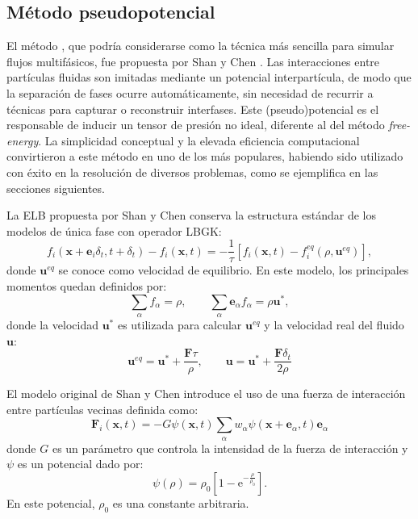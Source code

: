 \subsection*{M\'etodo pseudopotencial}
El m\'etodo \pp{}, que podr\'ia considerarse como la t\'ecnica m\'as sencilla para simular flujos multif\'asicos, fue propuesta por Shan y Chen \cite{shan_lattice_1993,shan_simulation_1994}. Las interacciones entre part\'iculas fluidas son imitadas mediante un potencial interpart\'icula, de modo que la separaci\'on de fases ocurre autom\'aticamente, sin necesidad de recurrir a t\'ecnicas para capturar o reconstruir interfases. Este (pseudo)potencial es el responsable de inducir un tensor de presi\'on no ideal, diferente al del m\'etodo \emph{free-energy}. La simplicidad conceptual y la elevada eficiencia computacional convirtieron a este m\'etodo en uno de los m\'as populares, habiendo sido utilizado con \'exito en la resoluci\'on de diversos problemas, como se ejemplifica en las secciones siguientes.
\par 
La ELB propuesta por Shan y Chen conserva la estructura est\'andar de los modelos de \'unica fase con operador LBGK:
\begin{equation}
	f_i(\bm{x}+\bm{e}_i\delta_t,t+\delta_t) - f_i(\bm{x},t)= -\dfrac{1}{\tau}\left[ f_i(\bm{x},t) - f_i^{eq}(\rho,\bm{u}^{eq}) \right],
\end{equation}
donde $\bm{u}^{eq}$ se conoce como velocidad de equilibrio. En este modelo, los principales momentos quedan definidos por:
\begin{equation}
	\sum_{\alpha} f_{\alpha} = \rho, \qquad	\sum_{\alpha} \bm{e}_{\alpha} f_{\alpha} = \rho \bm{u}^*,
\end{equation}
donde la velocidad $\bm{u}^*$ es utilizada para calcular $\bm{u}^{eq}$ y la velocidad real del fluido $\bm{u}$:
\begin{equation}
	\bm{u}^{eq} = \bm{u}^* + \dfrac{\bm{F}\tau}{\rho}, \qquad \bm{u} = \bm{u}^* + \dfrac{\bm{F}\delta_t}{2\rho}
\end{equation}

El modelo original de Shan y Chen introduce el uso de una fuerza de interacci\'on entre part\'iculas vecinas definida como:
\begin{equation}
	\bm{F}_{i}(\bm{x},t) = -G\psi(\bm{x},t)\sum_{\alpha} w_{\alpha} \psi(\bm{x}+\bm{e}_{\alpha},t)\bm{e}_{\alpha}
\end{equation}
donde $G$ es un par\'ametro que controla la intensidad de la fuerza de interacci\'on y $\psi$ es un potencial dado por:
\begin{equation}
	\psi(\rho) = \rho_0 \left[ 1-\mbox{e}^{-\frac{\rho}{\rho_0}} \right].
\end{equation}
En este potencial, $\rho_0$ es una constante arbitraria.

